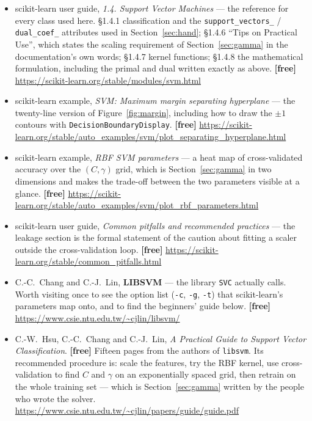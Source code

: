 \documentclass[11pt]{article}
\begin{document}
\begin{itemize}[leftmargin=*]
  \item scikit-learn user guide, \emph{1.4. Support Vector Machines} --- the
    reference for every class used here. \S1.4.1 classification and the
    \texttt{support\_vectors\_} / \texttt{dual\_coef\_} attributes used in
    Section~\ref{sec:hand}; \S1.4.6 ``Tips on Practical Use'', which states the
    scaling requirement of Section~\ref{sec:gamma} in the documentation's own
    words; \S1.4.7 kernel functions; \S1.4.8 the mathematical formulation,
    including the primal and dual written exactly as above.
    \textbf{[free]} \url{https://scikit-learn.org/stable/modules/svm.html}
  \item scikit-learn example, \emph{SVM: Maximum margin separating
    hyperplane} --- the twenty-line version of Figure~\ref{fig:margin},
    including how to draw the $\pm1$ contours with
    \texttt{DecisionBoundaryDisplay}. \textbf{[free]}
    \url{https://scikit-learn.org/stable/auto_examples/svm/plot_separating_hyperplane.html}
  \item scikit-learn example, \emph{RBF SVM parameters} --- a heat map of
    cross-validated accuracy over the $(C, \gamma)$ grid, which is
    Section~\ref{sec:gamma} in two dimensions and makes the trade-off between
    the two parameters visible at a glance. \textbf{[free]}
    \url{https://scikit-learn.org/stable/auto_examples/svm/plot_rbf_parameters.html}
  \item scikit-learn user guide, \emph{Common pitfalls and recommended
    practices} --- the leakage section is the formal statement of the caution
    about fitting a scaler outside the cross-validation loop. \textbf{[free]}
    \url{https://scikit-learn.org/stable/common_pitfalls.html}
  \item C.-C.\ Chang and C.-J.\ Lin, \textbf{LIBSVM} --- the library
    \texttt{SVC} actually calls. Worth visiting once to see the option list
    (\texttt{-c}, \texttt{-g}, \texttt{-t}) that scikit-learn's parameters map
    onto, and to find the beginners' guide below. \textbf{[free]}
    \url{https://www.csie.ntu.edu.tw/~cjlin/libsvm/}
  \item C.-W.\ Hsu, C.-C.\ Chang and C.-J.\ Lin, \emph{A Practical Guide to
    Support Vector Classification}. \textbf{[free]} Fifteen pages from the
    authors of \texttt{libsvm}. Its recommended procedure is: scale the
    features, try the RBF kernel, use cross-validation to find $C$ and
    $\gamma$ on an exponentially spaced grid, then retrain on the whole
    training set --- which is Section~\ref{sec:gamma} written by the people who
    wrote the solver.
    \url{https://www.csie.ntu.edu.tw/~cjlin/papers/guide/guide.pdf}
\end{itemize}
\end{document}
